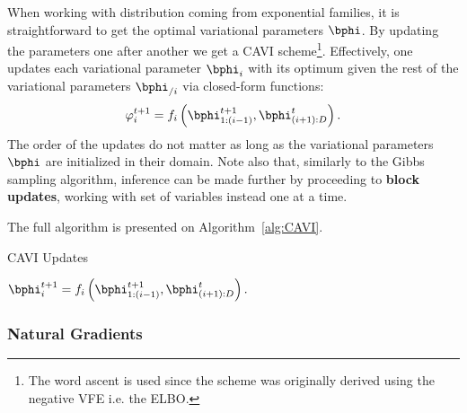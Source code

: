 When working with distribution coming from exponential families, it is straightforward to get the optimal variational parameters $\bphi$.
By updating the parameters one after another we get a \ac{CAVI} scheme\footnote{The word ascent is used since the scheme was originally derived using the negative \ac{VFE} i.e. the \ac{ELBO}.}.
Effectively, one updates each variational parameter $\bphi_i$ with its optimum given the rest of the variational parameters $\bphi_{/i}$ via closed-form functions:
\begin{align}
\varphi_i^{t+1} = f_i\left(\bphi_{1:(i-1)}^{t+1}, \bphi_{(i+1):D}^t\right).
\end{align}
The order of the updates do not matter as long as the variational parameters $\bphi$ are initialized in their domain.
Note also that, similarly to the Gibbs sampling algorithm, inference can be made further by proceeding to \textbf{block updates}, working with set of variables instead one at a time.

The full algorithm is presented on Algorithm~\ref{alg:CAVI}.

\begin{algorithm}
    \caption{\ac{CAVI} Updates}
    \label{alg:CAVI}
    \begin{algorithmic}
                \State $\bphi_i^{t+1} = f_i\left(\bphi_{1:(i-1)}^{t+1}, \bphi_{(i+1):D}^t\right).$
            \EndFor
        \EndWhile
    \end{algorithmic}
\end{algorithm}


\subsubsection{Natural Gradients}

